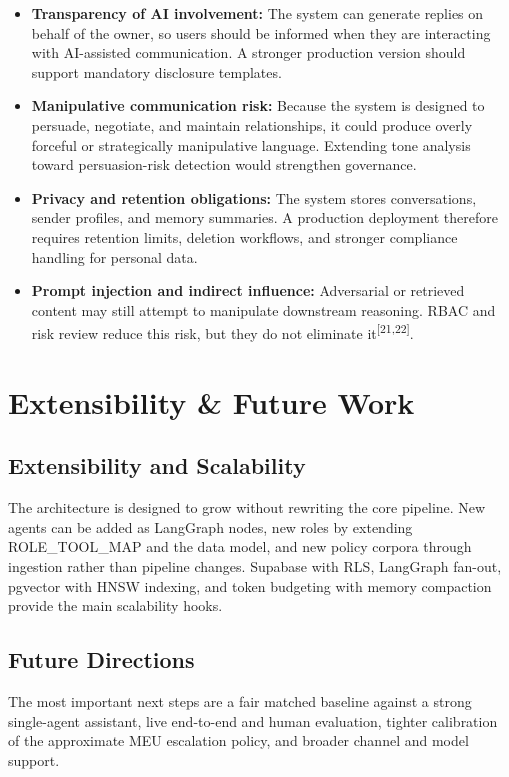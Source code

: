 \documentclass[11pt]{article}
\begin{document}
\begin{itemize}
\item \textbf{Transparency of AI involvement:} The system can generate replies on behalf of the owner, so users should be informed when they are interacting with AI-assisted communication. A stronger production version should support mandatory disclosure templates.

\item \textbf{Manipulative communication risk:} Because the system is designed to persuade, negotiate, and maintain relationships, it could produce overly forceful or strategically manipulative language. Extending tone analysis toward persuasion-risk detection would strengthen governance.

\item \textbf{Privacy and retention obligations:} The system stores conversations, sender profiles, and memory summaries. A production deployment therefore requires retention limits, deletion workflows, and stronger compliance handling for personal data.

\item \textbf{Prompt injection and indirect influence:} Adversarial or retrieved content may still attempt to manipulate downstream reasoning. RBAC and risk review reduce this risk, but they do not eliminate it\textsuperscript{[21,22]}.
\end{itemize}


\section{Extensibility \& Future Work}

\subsection{Extensibility and Scalability}
The architecture is designed to grow without rewriting the core pipeline. New agents can be added as LangGraph nodes, new roles by extending ROLE\_TOOL\_MAP and the data model, and new policy corpora through ingestion rather than pipeline changes. Supabase with RLS, LangGraph fan-out, pgvector with HNSW indexing, and token budgeting with memory compaction provide the main scalability hooks.

\subsection{Future Directions}

The most important next steps are a fair matched baseline against a strong single-agent assistant, live end-to-end and human evaluation, tighter calibration of the approximate MEU escalation policy, and broader channel and model support.
\end{document}
